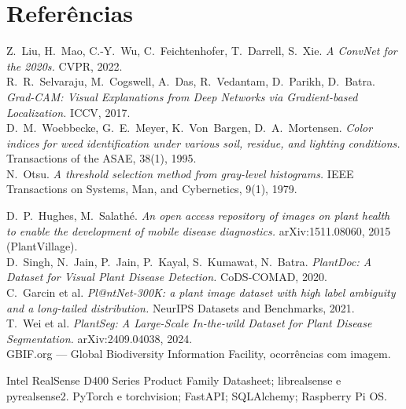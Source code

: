 \documentclass[11pt,a4paper]{article}
\begin{document}
\section*{Referências}
\small
\begin{description}[style=nextline, leftmargin=0pt, font=\normalfont\bfseries]
\item[Modelo e métodos]
Z.~Liu, H.~Mao, C.-Y.~Wu, C.~Feichtenhofer, T.~Darrell, S.~Xie. \emph{A ConvNet for
the 2020s.} CVPR, 2022.\\
R.~R.~Selvaraju, M.~Cogswell, A.~Das, R.~Vedantam, D.~Parikh, D.~Batra.
\emph{Grad-CAM: Visual Explanations from Deep Networks via Gradient-based
Localization.} ICCV, 2017.\\
D.~M.~Woebbecke, G.~E.~Meyer, K.~Von~Bargen, D.~A.~Mortensen. \emph{Color indices
for weed identification under various soil, residue, and lighting conditions.}
Transactions of the ASAE, 38(1), 1995.\\
N.~Otsu. \emph{A threshold selection method from gray-level histograms.} IEEE
Transactions on Systems, Man, and Cybernetics, 9(1), 1979.
\item[Conjuntos de dados usados no treino (não distribuídos)]
D.~P.~Hughes, M.~Salathé. \emph{An open access repository of images on plant health
to enable the development of mobile disease diagnostics.} arXiv:1511.08060, 2015
(PlantVillage).\\
D.~Singh, N.~Jain, P.~Jain, P.~Kayal, S.~Kumawat, N.~Batra. \emph{PlantDoc: A Dataset
for Visual Plant Disease Detection.} CoDS-COMAD, 2020.\\
C.~Garcin et al. \emph{Pl@ntNet-300K: a plant image dataset with high label ambiguity
and a long-tailed distribution.} NeurIPS Datasets and Benchmarks, 2021.\\
T.~Wei et al. \emph{PlantSeg: A Large-Scale In-the-wild Dataset for Plant Disease
Segmentation.} arXiv:2409.04038, 2024.\\
GBIF.org --- Global Biodiversity Information Facility, ocorrências com imagem.
\item[Hardware e software]
Intel RealSense D400 Series Product Family Datasheet; librealsense e pyrealsense2.
PyTorch e torchvision; FastAPI; SQLAlchemy; Raspberry Pi OS.
\end{description}
\end{document}
